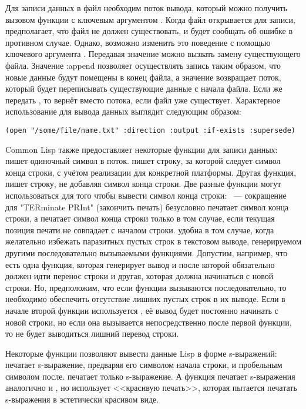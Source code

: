 Для записи данных в файл необходим поток вывода, который можно получить вызовом функции
 с ключевым аргументом  . Когда файл открывается
для записи,  предполагает, что файл не должен существовать, и будет сообщать об
ошибке в противном случае. Однако, возможно изменить это поведение с помощью ключевого
аргумента . Передавая значение  можно вызвать замену
существующего файла. Значение :append позволяет осуществлять запись таким образом, что
новые данные будут помещены в конец файла, а значение  возвращает поток,
который будет переписывать существующие данные с начала файла. Если же передать
, то  вернёт  вместо потока, если файл уже
существует. Характерное использование  для вывода данных выглядит следующим
образом:

\begin{lstlisting}
(open "/some/file/name.txt" :direction :output :if-exists :supersede)
\end{lstlisting}

Common Lisp также предоставляет некоторые функции для записи данных: 
пишет одиночный символ в поток.  пишет строку, за которой следует символ
конца строки, с учётом реализации для конкретной платформы. Другая функция,
 пишет строку, не добавляя символ конца строки. Две разные функции
могут использоваться для того чтобы вывести символ конца строки: ~---
сокращение для "TERminate PRInt" (закончить печать) безусловно печатает символ конца
строки, а  печатает символ конца строки только в том случае, если текущая
позиция печати не совпадает с началом строки.  удобна в том случае, когда
желательно избежать паразитных пустых строк в текстовом выводе, генерируемом другими
последовательно вызываемыми функциями. Допустим, например, что есть одна функция, которая
генерирует вывод и после которой обязательно должен идти перенос строки и другая, которая
должна начинаться с новой строки. Но, предположим, что если функции вызываются
последовательно, то необходимо обеспечить отсутствие лишних пустых строк в их выводе. Если
в начале второй функции используется , её вывод будет постоянно начинать
с новой строки, но если она вызывается непосредственно после первой функции, то не будет
выводиться лишний перевод строки.

Некоторые функции позволяют вывести данные Lisp в форме s-выражений:  печатает
s-выражение, предваряя его символом начала строки, и пробельным символом
после.  печатает только s-выражение. А функция  печатает
s-выражения аналогично  и , но использует <<красивую печать>>,
которая пытается печатать s-выражения в эстетически красивом виде.

